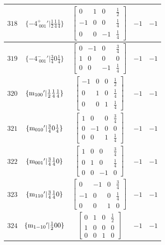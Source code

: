 \documentclass[fleqn,8pt]{jsarticle}
\begin{document}
\begin{longtable}{ccccc}
$ 318 $ & $ \{-4^{+}_{\,\,001}{}'|\frac{1}{2} \frac{1}{4} \frac{1}{4}\} $ & $ \begin{bmatrix} 0 & 1 & 0 & \frac{1}{2} \\ -1 & 0 & 0 & \frac{1}{4} \\ 0 & 0 & -1 & \frac{1}{4} \end{bmatrix} $ & $ -1 $ & $ -1 $ \\ \hline
$ 319 $ & $ \{-4^{-}_{\,\,001}{}'|\frac{3}{4} 0 \frac{1}{4}\} $ & $ \begin{bmatrix} 0 & -1 & 0 & \frac{3}{4} \\ 1 & 0 & 0 & 0 \\ 0 & 0 & -1 & \frac{1}{4} \end{bmatrix} $ & $ -1 $ & $ -1 $ \\ \hline
$ 320 $ & $ \{{\rm m}_{100}{}'|\frac{1}{2} \frac{1}{4} \frac{1}{4}\} $ & $ \begin{bmatrix} -1 & 0 & 0 & \frac{1}{2} \\ 0 & 1 & 0 & \frac{1}{4} \\ 0 & 0 & 1 & \frac{1}{4} \end{bmatrix} $ & $ -1 $ & $ -1 $ \\ \hline
$ 321 $ & $ \{{\rm m}_{010}{}'|\frac{3}{4} 0 \frac{1}{4}\} $ & $ \begin{bmatrix} 1 & 0 & 0 & \frac{3}{4} \\ 0 & -1 & 0 & 0 \\ 0 & 0 & 1 & \frac{1}{4} \end{bmatrix} $ & $ -1 $ & $ -1 $ \\ \hline
$ 322 $ & $ \{{\rm m}_{001}{}'|\frac{3}{4} \frac{1}{4} 0\} $ & $ \begin{bmatrix} 1 & 0 & 0 & \frac{3}{4} \\ 0 & 1 & 0 & \frac{1}{4} \\ 0 & 0 & -1 & 0 \end{bmatrix} $ & $ -1 $ & $ -1 $ \\ \hline
$ 323 $ & $ \{{\rm m}_{110}{}'|\frac{3}{4} \frac{1}{4} 0\} $ & $ \begin{bmatrix} 0 & -1 & 0 & \frac{3}{4} \\ -1 & 0 & 0 & \frac{1}{4} \\ 0 & 0 & 1 & 0 \end{bmatrix} $ & $ -1 $ & $ -1 $ \\ \hline
$ 324 $ & $ \{{\rm m}_{1-10}{}'|\frac{1}{2} 0 0\} $ & $ \begin{bmatrix} 0 & 1 & 0 & \frac{1}{2} \\ 1 & 0 & 0 & 0 \\ 0 & 0 & 1 & 0 \end{bmatrix} $ & $ -1 $ & $ -1 $ \\ \hline

\end{longtable}
\end{document}
